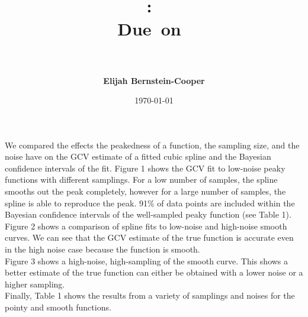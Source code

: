 \documentclass[11pt]{article}
\title{\vspace{0in}
    \textmd{\textbf{\hmwkClass:\ \hmwkTitle}}\\
    \normalsize\vspace{0.1in}\small{Due\ on\ \hmwkDueDate}\\
    \vspace{0.1in}\large{\textit{\hmwkClassInstructor\ \hmwkClassTime}}
    \vspace{0.2in}}
\author{\textbf{Elijah Bernstein-Cooper}}
\date{\today} %
\begin{document}
\maketitle

\begin{homeworkProblem}

    We compared the effects the peakedness of a function, the sampling size,
    and the noise have on the GCV estimate of a fitted cubic spline and the
    Bayesian confidence intervals of the fit. Figure 1 shows the GCV fit to
    low-noise peaky functions with different samplings. For a low number of
    samples, the spline smooths out the peak completely, however for a large
    number of samples, the spline is able to reproduce the peak. 91\% of data
    points are included within the Bayesian confidence intervals of the
    well-sampled peaky function (see Table 1). \\

    Figure 2 shows a comparison of spline fits to low-noise and high-noise
    smooth curves. We can see that the GCV estimate of the true function is
    accurate even in the high noise case because the function is smooth.\\

    Figure 3 shows a high-noise, high-sampling of the smooth curve. This shows
    a better estimate of the true function can either be obtained with a lower
    noise or a higher sampling. \\

    Finally, Table 1 shows the results from a variety of samplings and noises
    for the pointy and smooth functions. \\


\end{homeworkProblem}
\end{document}
